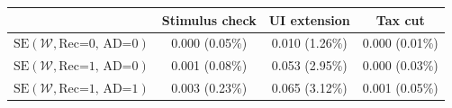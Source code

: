 \begin{tabular}{@{}lccc@{}}
\toprule
                          & Stimulus check      & UI extension    & Tax cut    \\  \midrule
$\mathrm{SE}(\mathcal{W}, \text{Rec=0, AD=0})$ & 0.000 (0.05\%)  & 0.010 (1.26\%)  & 0.000 (0.01\%)     \\
$\mathrm{SE}(\mathcal{W}, \text{Rec=1, AD=0})$ & 0.001 (0.08\%)  & 0.053 (2.95\%)  & 0.000 (0.03\%)     \\
$\mathrm{SE}(\mathcal{W}, \text{Rec=1, AD=1})$ & 0.003 (0.23\%)  & 0.065 (3.12\%)  & 0.001 (0.05\%)     \\ \bottomrule
\end{tabular}
